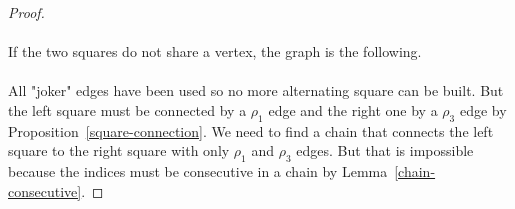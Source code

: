 \begin{proof}
\paragraph{}
If the two squares do not share a vertex, the graph is the following.

\begin{figure}[H]
  \begin{center}
    \caption{}
  \end{center}
\end{figure}

\paragraph{}
All "joker" edges have been used so no more alternating square can be built. But the left square must be connected by a $\rho_1$ edge and the right one by a $\rho_3$ edge by Proposition~\ref{square-connection}. We need to find a chain that connects the left square to the right square with only $\rho_1$ and $\rho_3$ edges. But that is impossible because the indices must be consecutive in a chain by Lemma~\ref{chain-consecutive}.


\end{proof}
